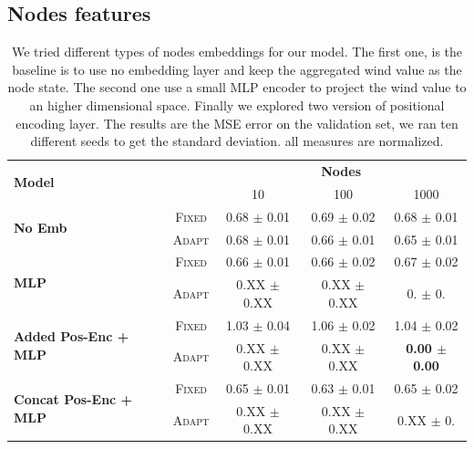 \documentclass[a4paper,10pt]{article}
\begin{document}
\subsection{Nodes features}

\begin{table}
  \label{tab:nodes}
  \centering
  \begin{tabular}{lcccc} \toprule
    \multirow{2}{*}{\textbf{Model}}                &                            & \multicolumn{3}{c}{\textbf{Nodes}}                                                          \\ \cmidrule(lr){3-5}
                                                   &                            & 10                                 & 100                   & 1000                           \\ \hline
    \multirow{2}{*}{\textbf{No Emb}}               & \scriptsize \textsc{Fixed} & 0.68 \tiny $\pm$ 0.01              & 0.69 \tiny $\pm$ 0.02 & 0.68 \tiny $\pm$ 0.01          \\
                                                   & \scriptsize \textsc{Adapt} & 0.68 \tiny $\pm$ 0.01              & 0.66 \tiny $\pm$ 0.01 & 0.65 \tiny $\pm$ 0.01          \\
    \multirow{2}{*}{\textbf{MLP}}                  & \scriptsize \textsc{Fixed} & 0.66 \tiny $\pm$ 0.01              & 0.66 \tiny $\pm$ 0.02 & 0.67 \tiny $\pm$ 0.02          \\
                                                   & \scriptsize \textsc{Adapt} & 0.XX \tiny $\pm$ 0.XX              & 0.XX \tiny $\pm$ 0.XX & 0. \tiny $\pm$ 0.              \\
    \multirow{2}{*}{\textbf{Added Pos-Enc + MLP}}  & \scriptsize \textsc{Fixed} & 1.03 \tiny $\pm$ 0.04              & 1.06 \tiny $\pm$ 0.02 & 1.04 \tiny $\pm$ 0.02          \\
                                                   & \scriptsize \textsc{Adapt} & 0.XX \tiny $\pm$ 0.XX              & 0.XX \tiny $\pm$ 0.XX & \textbf{0.00 \tiny $\pm$ 0.00} \\
    \multirow{2}{*}{\textbf{Concat Pos-Enc + MLP}} & \scriptsize \textsc{Fixed} & 0.65 \tiny $\pm$ 0.01              & 0.63 \tiny $\pm$ 0.01 & 0.65 \tiny $\pm$ 0.02          \\
                                                   & \scriptsize \textsc{Adapt} & 0.XX \tiny $\pm$ 0.XX              & 0.XX \tiny $\pm$ 0.XX & 0.XX \tiny $\pm$ 0.            \\

    \bottomrule
  \end{tabular}
  \caption{
    We tried different types of nodes embeddings for our model. The first one, is the baseline is to use no embedding layer and keep the aggregated wind value as the node state. The second one use a small MLP encoder to project the wind value to an higher dimensional space. Finally we explored two version of positional encoding layer. The results are the MSE error on the validation set, we ran ten different seeds to get the standard deviation. all measures are normalized.
  }
\end{table}
\end{document}
